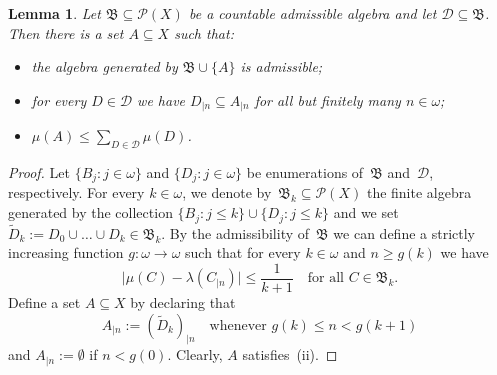 \documentclass[12pt]{amsart}
\newcommand{\sub}{\subseteq}
\newcommand{\algb}{\mathfrak B}
\newcommand{\0}{\protect{\bf 0}}
\newcommand{\1}{\protect{\bf 1}}
\newtheorem{lemma}[theo]{Lemma}
\theoremstyle{definition}
\theoremstyle{remark}
\numberwithin{equation}{section}
\begin{document}
\begin{lemma}\label{ex1:2}
Let $\algb \sub \mathcal{P}(X)$ be a countable admissible algebra and let $\mathcal{D} \sub \algb$. Then
there is a set $A\sub X$ such that: 
\begin{itemize}
\item[(i)] the algebra generated by $\algb\cup\{A\}$ is admissible;
\item[(ii)] for every $D\in \mathcal{D}$ we have
$D_{|n}\sub A_{|n}$ for all but finitely many $n\in \omega$;
\item[(iii)] $\mu(A)\le \sum_{D\in \mathcal{D}} \mu(D)$.
\end{itemize}
\end{lemma}
\begin{proof}
Let $\{B_j:j\in\omega\}$ and $\{D_j:j\in \omega\}$ be enumerations of~$\algb$ and~$\mathcal{D}$,
respectively. For every $k\in \omega$, we denote by~$\algb_k \sub \mathcal{P}(X)$ the finite algebra generated by 
the collection $\{B_j:j\le k\}\cup\{D_j:j\leq k\}$ and we set
$\tilde{D}_k:=D_0\cup\ldots\cup D_k \in \algb_k$.
By the admissibility of~$\algb$ we can define a strictly increasing function $g:\omega\to\omega$ such that
for every $k \in \omega$ and $n \ge g(k)$ we have
\begin{equation}\label{equation:adm}
	\big|\mu(C)-\lambda(C_{|n})\big| \leq \frac{1}{k+1}
	\quad
	\mbox{for all }C\in \algb_k.
\end{equation}
Define a set $A\sub X$ by declaring that 
\[
	A_{|n}:=(\tilde{D}_k)_{|n} \quad\mbox{whenever } g(k)\le n < g(k+1)
\]
and $A_{|n}:=\emptyset$ if $n<g(0)$. Clearly, $A$ satisfies~(ii). 


\end{proof}
\end{document}
